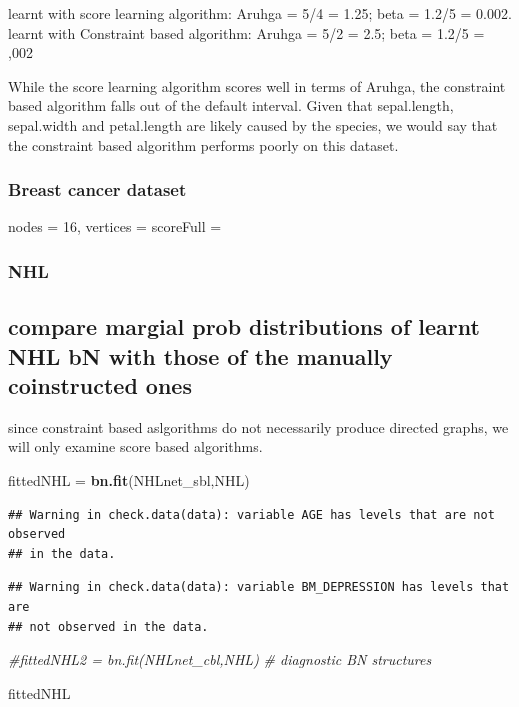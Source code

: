\documentclass[]{article}
\newenvironment{Shaded}{\begin{snugshade}}{\end{snugshade}}
\newcommand{\KeywordTok}[1]{\textcolor[rgb]{0.13,0.29,0.53}{\textbf{{#1}}}}
\newcommand{\StringTok}[1]{\textcolor[rgb]{0.31,0.60,0.02}{{#1}}}
\newcommand{\CommentTok}[1]{\textcolor[rgb]{0.56,0.35,0.01}{\textit{{#1}}}}
\newcommand{\NormalTok}[1]{{#1}}
\begin{document}
learnt with score learning algorithm: Aruhga = 5/4 = 1.25; beta = 1.2/5
= 0.002. learnt with Constraint based algorithm: Aruhga = 5/2 = 2.5;
beta = 1.2/5 = ,002

While the score learning algorithm scores well in terms of Aruhga, the
constraint based algorithm falls out of the default interval. Given that
sepal.length, sepal.width and petal.length are likely caused by the
species, we would say that the constraint based algorithm performs
poorly on this dataset.

\subsubsection{Breast cancer dataset}\label{breast-cancer-dataset}

nodes = 16, vertices = scoreFull =

\subsubsection{NHL}\label{nhl}

\subsection{compare margial prob distributions of learnt NHL bN with
those of the manually coinstructed
ones}\label{compare-margial-prob-distributions-of-learnt-nhl-bn-with-those-of-the-manually-coinstructed-ones}

since constraint based aslgorithms do not necessarily produce directed
graphs, we will only examine score based algorithms.

\begin{Shaded}
\begin{Highlighting}[]
\NormalTok{fittedNHL =}\StringTok{ }\KeywordTok{bn.fit}\NormalTok{(NHLnet_sbl,NHL)}
\end{Highlighting}
\end{Shaded}

\begin{verbatim}
## Warning in check.data(data): variable AGE has levels that are not observed
## in the data.
\end{verbatim}

\begin{verbatim}
## Warning in check.data(data): variable BM_DEPRESSION has levels that are
## not observed in the data.
\end{verbatim}

\begin{Shaded}
\begin{Highlighting}[]
\CommentTok{#fittedNHL2 = bn.fit(NHLnet_cbl,NHL)}
\CommentTok{# diagnostic BN structures}

\NormalTok{fittedNHL}
\end{Highlighting}
\end{Shaded}
\end{document}
